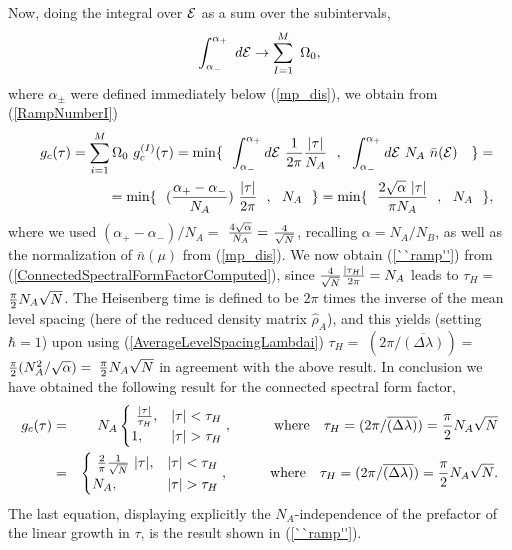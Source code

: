 \documentclass[aps,prb,preprint,onecolumn,amsmath,amssymb,superscriptaddress,eqsecnum,floatfix,scrartcl]{revtex4-1}
\begin{document}
Now, doing the integral over ${\cal E}$ as a sum over the subintervals,
\begin{eqnarray}
\int_{\alpha_-}^{\alpha_+} \ d{\cal E} 
 \to \sum_{I=1}^M \ \Omega_0,
\end{eqnarray}
where $\alpha_{\pm}$ were defined immediately below (\ref{mp_dis}),
we obtain from (\ref{RampNumberI})
\begin{eqnarray} \nonumber
&& g_c(\tau)
=
\sum_{i=1}^M \Omega_0 \ g_c^{(I)}(\tau)=
{\rm min}\{
\ \ 
\int_{\alpha_-}^{\alpha_+}  d{\cal E}  \ 
 {1\over 2\pi}  \frac{|\tau|}{N_A}
\ \ , \ \ 
\int_{\alpha_-}^{\alpha_+}  d{\cal E} 
 \ N_A \ \bar{n}({\cal E}) \ 
\ \ \} =  \\  \label{ConnectedSpectralFormFactorComputed}
&&
=
{\rm min}\{
\ \ 
({\alpha_+-\alpha_-\over N_A})\ 
 \frac{|\tau|}{2\pi} 
\ \ , \ \ 
N_A
\ \ \}
=
{\rm min}\{
\ \ 
{
2 \sqrt{\alpha} \  |\tau|\over \pi N_A} 
\ \ , \ \ 
N_A
\ \ \},
\end{eqnarray}
where we used $(\alpha_+-\alpha_-)/N_A=$ ${4 \sqrt{\alpha}\over N_A}=$ ${4 \over \sqrt{N}}$, recalling  $\alpha=N_A/N_B$,
as well as  the normalization 
of $\bar{n}(\mu)$ from (\ref{mp_dis}). We now  obtain (\ref{``ramp''})
from (\ref{ConnectedSpectralFormFactorComputed}), since ${4\over \sqrt{N}} {|\tau_H|\over 2\pi} =N_A$ 
leads to
$\tau_H= $
${\pi \over 2}  N_A \sqrt{N}$. The Heisenberg time is defined to be $2\pi$ times the inverse of the mean level spacing (here of
the reduced density matrix ${\hat \rho}_A$), and 
this yields  (setting $\hbar=1$)
upon using (\ref{AverageLevelSpacingLambdai})
$\tau_H=$
$(2\pi/ \overline{\left (\Delta \lambda\right )} )=$ 
$
{\pi \over 2} (N_A^2/\sqrt{\alpha})=$
${\pi\over 2} N_A \sqrt{N}$ in agreement with the above result. In conclusion
we have obtained the following result for the connected spectral form factor,
\begin{eqnarray}
\label{gConnectedResultOneAppendix}
g_c(\tau)&=&
N_A
\begin{cases}  \  \frac{|\tau|}{\tau_H}, & |\tau| <   \tau_H \\ 
1, &   |\tau| >   \tau_H
 \end{cases},
\qquad \quad {\rm where} \  \ \ \tau_H=
(2\pi/ \overline{\left (\Delta \lambda\right )} )=
{\pi\over 2} N_A \sqrt{N} \\ \label{gConnectedResultTwoAppendix}
&=&\begin{cases}  \   {2 \over \pi} {1\over \sqrt{N}} \ |\tau|, & |\tau| <   \tau_H \\ 
N_A, &   |\tau| >   \tau_H
 \end{cases},
\qquad \quad {\rm where} \  \ \ \tau_H=
(2\pi/ \overline{\left (\Delta \lambda\right )} )=
{\pi\over 2} N_A \sqrt{N}.
\end{eqnarray}
The last equation, displaying explicitly the $N_A$-independence of the prefactor of the linear growth in $\tau$,  is  the result 
shown in (\ref{``ramp''}).






%

%


\end{document}
